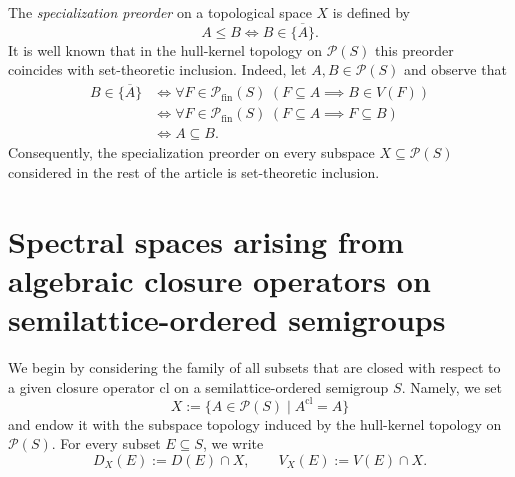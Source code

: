 \documentclass[10pt, reqno]{amsart}
\theoremstyle{plain}
\theoremstyle{definition}
\begin{document}
The \emph{specialization preorder} on a topological space $X$ is defined by 
\begin{equation*}
    A \leqslant B \iff B \in \overline{\{A\}}. 
\end{equation*}
It is well known that in the hull-kernel topology on $\mathcal{P}(S)$ this preorder coincides with set-theoretic inclusion. Indeed, let $A, B \in \mathcal{P}(S)$ and observe that 
\begin{equation*}\begin{aligned}
    B \in \overline{\{A\}} &\iff \forall F\in\mathcal{P}_\mathrm{fin}(S) \hspace{3pt} (F \subseteq A \implies B \in V(F)) \\ &\iff \forall F\in\mathcal{P}_\mathrm{fin}(S) \hspace{3pt} (F \subseteq A \implies F \subseteq B) \\ &\iff A \subseteq B. 
\end{aligned}\end{equation*}
Consequently, the specialization preorder on every subspace $X \subseteq\mathcal{P}(S)$ considered in the rest of the article is set-theoretic inclusion. 
\section{Spectral spaces arising from algebraic closure operators on semilattice-ordered semigroups}\label{spectral_spaces_arising_from_closures}
We begin by considering the family of all subsets that are closed with respect to a given closure operator $\mathrm{cl}$ on a semilattice-ordered semigroup $S$. Namely, we set $$X := \{A\in\mathcal{P}(S) \mid A^\mathrm{cl} = A\}$$ and endow it with the subspace topology induced by the hull-kernel topology on $\mathcal{P}(S)$. For every subset $E \subseteq S$, we write $$D_X(E) := D(E) \cap X, \qquad V_X(E) := V(E) \cap X.$$
\end{document}
